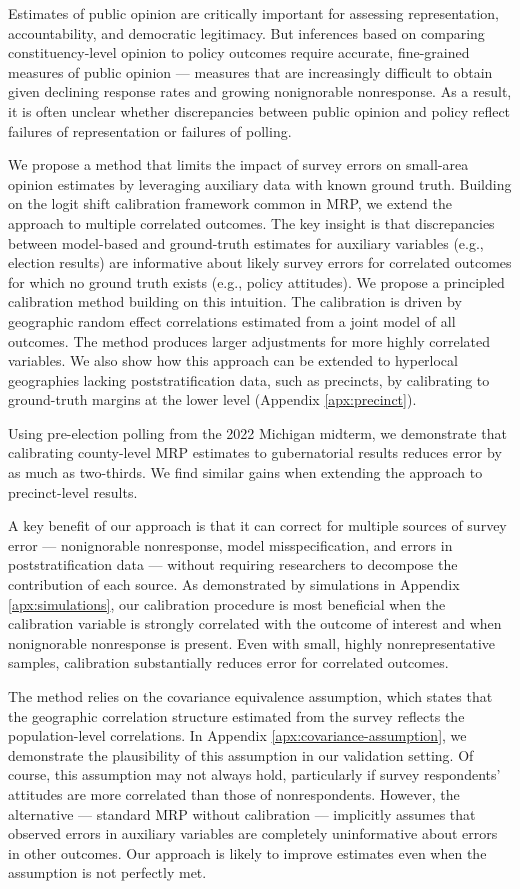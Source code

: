 
Estimates of public opinion are critically important for assessing representation, accountability, and democratic legitimacy. But inferences based on comparing constituency-level opinion to policy outcomes require accurate, fine-grained measures of public opinion — measures that are increasingly difficult to obtain given declining response rates and growing nonignorable nonresponse. As a result, it is often unclear whether discrepancies between public opinion and policy reflect failures of representation or failures of polling.

We propose a method that limits the impact of survey errors on small-area opinion estimates by leveraging auxiliary data with known ground truth.
Building on the logit shift calibration framework common in MRP, we extend the approach to multiple correlated outcomes.
The key insight is that discrepancies between model-based and ground-truth estimates for auxiliary variables (e.g., election results) are informative about likely survey errors for correlated outcomes for which no  ground truth exists (e.g., policy attitudes). 
We propose a principled calibration method building on this intuition. 
The calibration is driven by geographic random effect correlations estimated from a joint model of all outcomes.
The method produces larger adjustments for more highly correlated variables. 
We also show how this approach can be extended to hyperlocal geographies lacking poststratification data, such as precincts, by calibrating to ground-truth margins at the lower level (Appendix \ref{apx:precinct}).

Using pre-election polling from the 2022 Michigan midterm, we demonstrate that calibrating county-level MRP estimates to gubernatorial results reduces error by as much as two-thirds. 
We find similar gains when extending the approach to precinct-level results.


A key benefit of our approach is that it can correct for multiple sources of survey error --- nonignorable nonresponse, model misspecification, and errors in poststratification data --- without requiring researchers to decompose the contribution of each source. 
As demonstrated by simulations in Appendix \ref{apx:simulations}, our calibration procedure is most beneficial when the calibration variable is strongly correlated with the outcome of interest and when nonignorable nonresponse is present. 
Even with small, highly nonrepresentative samples, calibration substantially reduces error for correlated outcomes.

The method relies on the covariance equivalence assumption, which states that the geographic correlation structure estimated from the survey reflects the population-level correlations. 
In Appendix \ref{apx:covariance-assumption}, we demonstrate the plausibility of this assumption in our validation setting.
Of course, this assumption may not always hold, particularly if survey respondents' attitudes are more correlated than those of nonrespondents. 
However, the alternative --- standard MRP without calibration --- implicitly assumes that observed errors in auxiliary variables are completely uninformative about errors in other outcomes.
Our approach is likely to improve estimates even when the assumption is not perfectly met.

